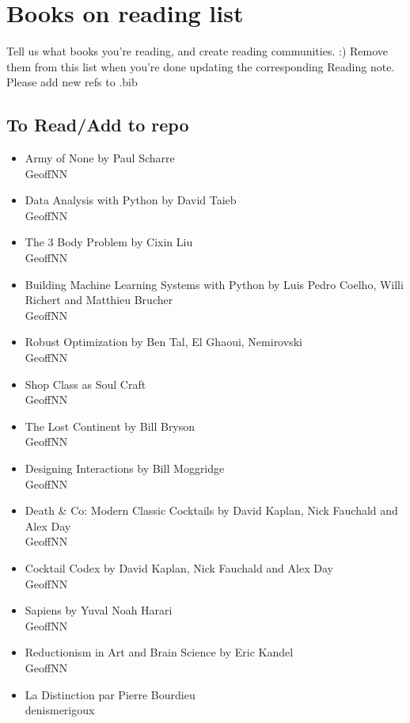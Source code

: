 
\section{Books on reading list}
Tell us what books you're reading, and create reading communities. :) Remove them from this list when you're done updating the corresponding Reading note. Please add new refs to .bib

\subsection{To Read/Add to repo}
\begin{itemize}
    \item Army of None by Paul Scharre \\
    GeoffNN
    \item Data Analysis with Python by David Taieb \\
    GeoffNN
    \item The 3 Body Problem by Cixin Liu\\
    GeoffNN
    \item Building Machine Learning Systems with Python by Luis Pedro Coelho, Willi Richert and Matthieu Brucher \\
    GeoffNN
    \item Robust Optimization by Ben Tal, El Ghaoui, Nemirovski \\
    GeoffNN
    \item Shop Class as Soul Craft \\
    GeoffNN
    \item The Lost Continent by Bill Bryson \\
    GeoffNN
    \item Designing Interactions by Bill Moggridge \\
    GeoffNN
    \item Death \& Co: Modern Classic Cocktails by David Kaplan, Nick Fauchald and Alex Day \\
    GeoffNN
    \item Cocktail Codex by David Kaplan, Nick Fauchald and Alex Day \\
    GeoffNN
    \item Sapiens by Yuval Noah Harari \\
    GeoffNN
    \item Reductionism in Art and Brain Science by Eric Kandel \\
    GeoffNN
    \item La Distinction par Pierre Bourdieu \\
    denismerigoux
\end{itemize}
